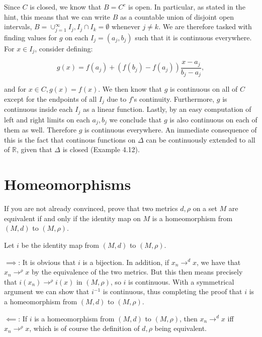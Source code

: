 \begin{solution}
    
    Since $C$ is closed, we know that $B = C^c$ is open.
    In particular, as stated in the hint, this means that we can write $B$ as a countable union of disjoint open intervals, $B = \cup_{j=1}^{\infty} I_j, I_j \cap I_k = \emptyset$ whenever $j \neq k$.
    We are therefore tasked with finding values for $g$ on each $I_j = (a_j, b_j)$ such that it is continuous everywhere.
    For $x \in I_j$, consider defining:

    \[g(x) = f(a_j) + (f(b_j) - f(a_j))\frac{x - a_j}{b_j - a_j},\]

    and for $x \in C, g(x) = f(x)$.
    We then know that $g$ is continuous on all of $C$ except for the endpoints of all $I_j$ due to $f$'s continuity.
    Furthermore, $g$ is continuous inside each $I_j$ as a linear function.
    Lastly, by an easy computation of left and right limits on each $a_j, b_j$ we conclude that $g$ is also continuous on each of them as well.
    Therefore $g$ is continuous everywhere.
    An immediate consequence of this is the fact that continous functions on $\Delta$ can be continuously extended to all of $\mathbb{R}$, given that $\Delta$ is closed (Example 4.12).

\end{solution}

\section{Homeomorphisms}

\begin{exercise}{43}
    If you are not already convinced, prove that two metrics $d, \rho$ on a set $M$ are equivalent if and only if the identity map on $M$ is a homeomorphism from $(M, d)$ to $(M, \rho)$.
\end{exercise}

\begin{solution}
    
    Let $i$ be the identity map from $(M, d)$ to $(M, \rho)$.

    $\implies$: It is obvious that $i$ is a bijection.
    In addition, if $x_n \rightarrow^{d} x$, we have that $x_n \rightarrow^{\rho} x$ by the equivalence of the two metrics.
    But this then means precisely that $i(x_n) \rightarrow^{\rho} i(x)$ in $(M, \rho)$, so $i$ is continuous.
    With a symmetrical argument we can show that $i^{-1}$ is continuous, thus completing the proof that $i$ is a homeomorphism from $(M, d)$ to $(M, \rho)$.

    $\impliedby$: If $i$ is a homeomorphism from $(M, d)$ to $(M, \rho)$, then $x_n \rightarrow^{d} x$ iff $x_n \rightarrow^{\rho} x$, which is of course the definition of $d, \rho$ being equivalent.
\end{solution}

